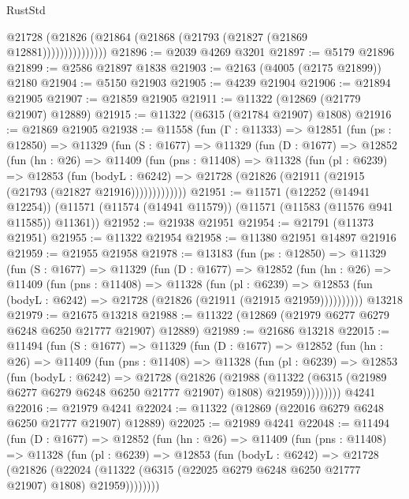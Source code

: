 \begin{lexlean}{RustStd}
\begin{coremodule}
                    @21728 (@21826 (@21864 (@21868 (@21793 (@21827 (@21869 @12881)))))))))))))))
@21896 := @2039 @4269 @3201
@21897 := @5179 @21896
@21899 := @2586 @21897 @1838
@21903 := @2163 (@4005 (@2175 @21899)) @2180
@21904 := @5150 @21903
@21905 := @4239 @21904
@21906 := @21894 @21905
@21907 := @21859 @21905
@21911 := @11322 (@12869 (@21779 @21907) @12889)
@21915 := @11322 (@6315 (@21784 @21907) @1808)
@21916 := @21869 @21905
@21938 := @11558
    (fun (Γ : @11333) =>
    @12851
      (fun (ps : @12850) =>
      @11329
        (fun (S : @1677) =>
        @11329
          (fun (D : @1677) =>
          @12852
            (fun (hn : @26) =>
            @11409
              (fun (pns : @11408) =>
              @11328
                (fun (pl : @6239) =>
                @12853
                  (fun (bodyL : @6242) =>
                  @21728 (@21826 (@21911 (@21915 (@21793 (@21827 @21916)))))))))))))
@21951 := @11571
    (@12252 (@14941 @12254))
    (@11571 (@11574 (@14941 @11579)) (@11571 (@11583 (@11576 @941 @11585)) @11361))
@21952 := @21938 @21951
@21954 := @21791 (@11373 @21951)
@21955 := @11322 @21954
@21958 := @11380 @21951 @14897 @21916
@21959 := @21955 @21958
@21978 := @13183
    (fun (ps : @12850) =>
    @11329
      (fun (S : @1677) =>
      @11329
        (fun (D : @1677) =>
        @12852
          (fun (hn : @26) =>
          @11409
            (fun (pns : @11408) =>
            @11328
              (fun (pl : @6239) =>
              @12853 (fun (bodyL : @6242) => @21728 (@21826 (@21911 (@21915 @21959))))))))))
    @13218
@21979 := @21675 @13218
@21988 := @11322 (@12869 (@21979 @6277 @6279 @6248 @6250 @21777 @21907) @12889)
@21989 := @21686 @13218
@22015 := @11494
    (fun (S : @1677) =>
    @11329
      (fun (D : @1677) =>
      @12852
        (fun (hn : @26) =>
        @11409
          (fun (pns : @11408) =>
          @11328
            (fun (pl : @6239) =>
            @12853
              (fun (bodyL : @6242) =>
              @21728
                (@21826
                  (@21988
                    (@11322
                      (@6315 (@21989 @6277 @6279 @6248 @6250 @21777 @21907) @1808)
                      @21959)))))))))
    @4241
@22016 := @21979 @4241
@22024 := @11322 (@12869 (@22016 @6279 @6248 @6250 @21777 @21907) @12889)
@22025 := @21989 @4241
@22048 := @11494
    (fun (D : @1677) =>
    @12852
      (fun (hn : @26) =>
      @11409
        (fun (pns : @11408) =>
        @11328
          (fun (pl : @6239) =>
          @12853
            (fun (bodyL : @6242) =>
            @21728
              (@21826
                (@22024
                  (@11322 (@6315 (@22025 @6279 @6248 @6250 @21777 @21907) @1808) @21959))))))))

\end{coremodule}
\end{lexlean}
